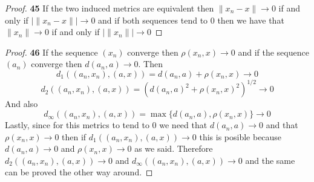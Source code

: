 \documentclass[11pt]{article}
\theoremstyle{definition}
\begin{document}
\cleardoublepage
    \begin{proof}{\textbf{45}}
        If the two induced metrics are equivalent then $\|x_n - x\| \to 0$ if and only
        if $|\|x_n - x\|| \to 0$ and if both sequences tend to 0 then we have that
        $\|x_n\| \to 0$ if and only if $|\|x_n\|| \to 0$
    \end{proof}
    \begin{proof}{\textbf{46}}
        If the sequence $(x_n)$ converge then $\rho(x_n,x) \to 0$ and 
        if the sequence $(a_n)$ converge then $d(a_n,a) \to 0$. Then
        $$d_1((a_n,x_n), (a,x)) = d(a_n,a) + \rho(x_n,x) \to 0$$
        $$d_2((a_n,x_n), (a,x)) = (d(a_n,a)^2 + \rho(x_n,x)^2)^{1/2} \to 0$$
        And also
        $$d_\infty((a_n,x_n), (a,x)) = \max\{d(a_n,a), \rho(x_n,x)\} \to 0$$
        Lastly, since for this metrics to tend to 0 we need that $d(a_n,a) \to 0$
        and that $\rho(x_n,x) \to 0$ then if $d_1((a_n,x_n), (a,x)) \to 0$
        this is posible because $d(a_n,a) \to 0$ and $\rho(x_n,x) \to 0$ as we said. 
        Therefore $d_2((a_n,x_n), (a,x)) \to 0$ and $d_\infty((a_n,x_n), (a,x)) \to 0$
        and the same can be proved the other way around.
    \end{proof}
\end{document}
